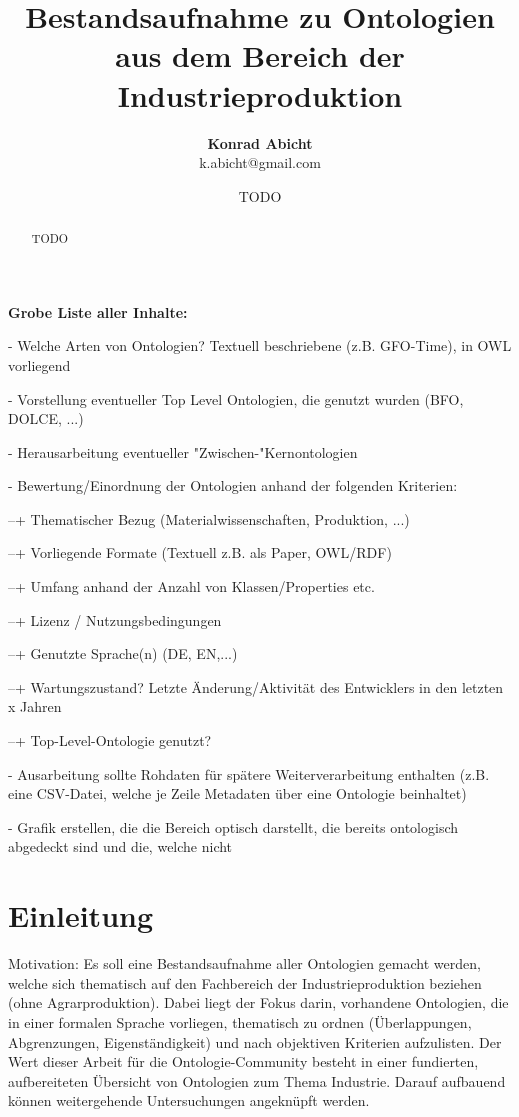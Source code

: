 \documentclass{article}
\title{Bestandsaufnahme zu Ontologien aus dem Bereich der Industrieproduktion}
\author{\textbf{Konrad Abicht} \\ k.abicht@gmail.com}
\date{TODO}
\begin{document}
\maketitle

\begin{abstract}
    TODO
\end{abstract}


\textbf{Grobe Liste aller Inhalte:}

- Welche Arten von Ontologien? Textuell beschriebene (z.B. GFO-Time), in OWL vorliegend

- Vorstellung eventueller Top Level Ontologien, die genutzt wurden (BFO, DOLCE, ...)

- Herausarbeitung eventueller "Zwischen-"Kernontologien

- Bewertung/Einordnung der Ontologien anhand der folgenden Kriterien:

--+ Thematischer Bezug (Materialwissenschaften, Produktion, ...)

--+ Vorliegende Formate (Textuell z.B. als Paper, OWL/RDF)

--+ Umfang anhand der Anzahl von Klassen/Properties etc.

--+ Lizenz / Nutzungsbedingungen

--+ Genutzte Sprache(n) (DE, EN,...)

--+ Wartungszustand? Letzte Änderung/Aktivität des Entwicklers in den letzten x Jahren

--+ Top-Level-Ontologie genutzt?

- Ausarbeitung sollte Rohdaten für spätere Weiterverarbeitung enthalten (z.B. eine CSV-Datei, welche je Zeile Metadaten über eine Ontologie beinhaltet)

- Grafik erstellen, die die Bereich optisch darstellt, die bereits ontologisch abgedeckt sind und die, welche nicht



\section{Einleitung}

Motivation: Es soll eine Bestandsaufnahme aller Ontologien gemacht werden, welche sich thematisch auf den Fachbereich der Industrieproduktion beziehen (ohne Agrarproduktion). Dabei liegt der Fokus darin, vorhandene Ontologien, die in einer formalen Sprache vorliegen, thematisch zu ordnen (Überlappungen, Abgrenzungen, Eigenständigkeit) und nach objektiven Kriterien aufzulisten. Der Wert dieser Arbeit für die Ontologie-Community besteht in einer fundierten, aufbereiteten Übersicht von Ontologien zum Thema Industrie. Darauf aufbauend können weitergehende Untersuchungen angeknüpft werden.
\end{document}
